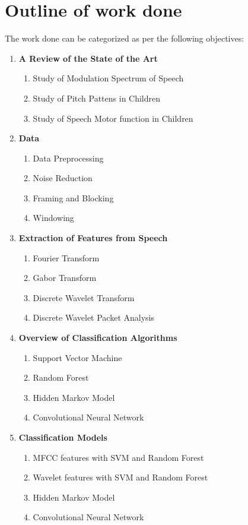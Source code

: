 \documentclass[11pt]{report}
\begin{document}
\section{Outline of work done}
The work done can be categorized as per the following objectives:
\begin{enumerate}


\item \textbf{A Review of the State of the Art}
\begin{enumerate}
\item Study of Modulation Spectrum of Speech
\item Study of Pitch Pattens in Children
\item Study of Speech Motor function in Children
\end{enumerate}

\item \textbf{Data}
\begin{enumerate}
\item Data Preprocessing
\item Noise Reduction
\item Framing and Blocking
\item Windowing
\end{enumerate}

\item \textbf{Extraction of  Features from Speech}
\begin{enumerate}
\item Fourier Transform
\item Gabor Transform
\item Discrete Wavelet Transform
\item Discrete Wavelet Packet Analysis
\end{enumerate}

\item \textbf{Overview of Classification Algorithms}
\begin{enumerate}
\item Support Vector Machine
\item Random Forest
\item Hidden Markov Model
\item Convolutional Neural Network
\end{enumerate}

\item \textbf{Classification Models}
\begin{enumerate}
\item MFCC features with SVM and Random Forest
\item Wavelet features with SVM and Random Forest
\item Hidden Markov Model
\item Convolutional Neural Network
\end{enumerate}


\end{enumerate}
\end{document}
